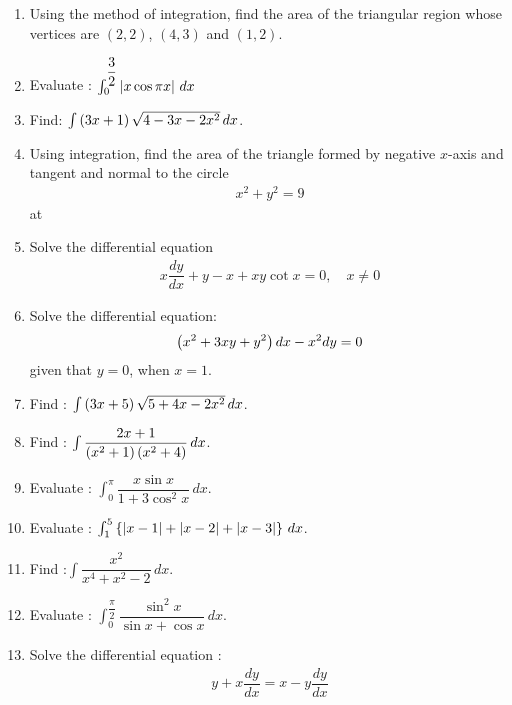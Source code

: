 \begin{enumerate}
	\item Using the method of integration, find the area of the triangular region whose vertices are $(2, 2)$, $(4, 3)$ and $(1, 2)$.
\item Evaluate : $\int_{0}^{\dfrac{3}{2}} \left\vert x \cos \pi x\right\vert\,dx$
    \item Find: $\int \left(3x +1\right)\sqrt{4-3x-2x^2} \,dx$.
    \item Using integration, find the area of the triangle formed by negative $x$-axis and tangent and normal to the circle
          \begin{align*}
              x^2 + y^2 =9
          \end{align*}
          at 
    \item Solve the differential equation
          \begin{align*}
              x\dfrac{dy}{dx} +y -x +xy \cot x= 0, \quad x\neq 0
          \end{align*}
    \item Solve the differential equation:
          \begin{align*}
              \left(x^2+3xy+y^2\right)dx -x^2dy = 0
          \end{align*}
          given that $y=0$, when $x=1$.
    \item Find : $\int \left(3x+5\right)\sqrt{5+4x-2x^2}\,dx$.
    \item Find : $\int \dfrac{2x+1}{\left(x^2+1\right)\left(x^2+4\right)}\,dx$.
    \item Evaluate : $\int_{0}^{\pi}\dfrac{x\sin x}{1+3\cos^2 x}\,dx$.
    \item Evaluate : $\int_{1}^{5}\left\{\left\vert x-1\right\vert+\left\vert x-2\right\vert+\left\vert x-3\right\vert\right\}\,dx$.
    \item Find :$\int \dfrac{x^2}{x^4 + x^2 -2}\,dx$.
    \item Evaluate : $\int_{0}^{\dfrac{\pi}{2}} \dfrac{\sin^2 x}{\sin x + \cos x} \,dx$.
    \item Solve the differential equation :
          \begin{align*}
              y+ x\dfrac{dy}{dx} = x-y\dfrac{dy}{dx}
          \end{align*}
\end{enumerate}
